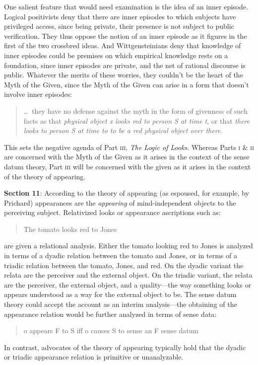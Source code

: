 \documentclass[11pt]{article}
\begin{document}
One salient feature that would need examination is the idea of an inner episode. Logical positivists deny that there are inner episodes to which subjects have privileged access, since being private, their presence is not subject to public verification. They thus oppose the notion of an inner episode as it figures in the first of the two crossbred ideas. And Wittgensteinians deny that knowledge of inner episodes could be premises on which empirical knowledge rests on a foundation, since inner episodes are private, and the net of rational discourse is public. Whatever the merits of these worries, they couldn't be the heart of the Myth of the Given, since the Myth of the Given can arise in a form that doesn't involve inner episodes:
\begin{quote}
    \ldots\ they have no defense against the myth in the form of givenness of such facts as that \emph{physical object x looks red to person S at time t}, or that \emph{there looks to person S at time to to be a red physical object over there}.
\end{quote}
This sets the negative agenda of Part \textsc{iii}, \emph{The Logic of Looks}. Whereas Parts \textsc{i} \& \textsc{ii} are concerned with the Myth of the Given as it arises in the context of the sense datum theory, Part \textsc{iii} will be concerned with the given as it arises in the context of the theory of appearing. 

\textbf{Section 11}: According to the theory of appearing (as espoused, for example, by Prichard) appearances are the \emph{appearing} of mind-independent objects to the perceiving subject. Relativized looks or appearance ascriptions such as:
\begin{quote}
    The tomato looks red to Jones
\end{quote}
are given a relational analysis. Either the tomato looking red to Jones is analyzed in terms of a dyadic relation between the tomato and Jones, or in terms of a triadic relation between the tomato, Jones, and red. On the dyadic variant the relata are the perceiver and the external object. On the triadic variant, the relata are the perceiver, the external object, and a quality---the way something looks or appears understood as a way for the external object to be. The sense datum theory could accept the account as an interim analysis---the obtaining of the appearance relation would be further analyzed in terms of sense data:
\begin{quote}
    o appears F to S iff o causes S to sense an F sense datum
\end{quote}
In contrast, advocates of the theory of appearing typically hold that the dyadic or triadic appearance relation is primitive or unanalyzable. 
\end{document}
